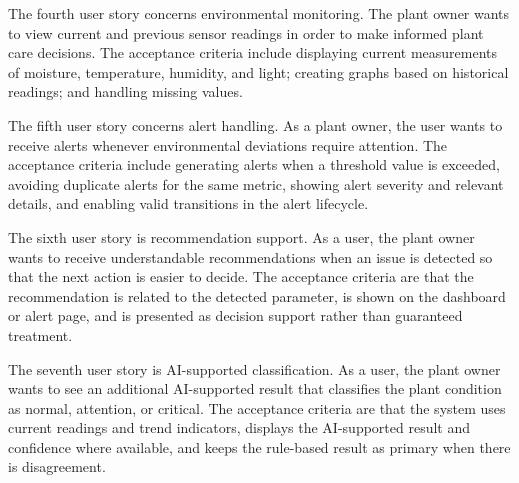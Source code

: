 The fourth user story concerns environmental monitoring. The plant owner wants to view current and previous sensor readings in order to make informed plant care decisions. The acceptance criteria include displaying current measurements of moisture, temperature, humidity, and light; creating graphs based on historical readings; and handling missing values.

The fifth user story concerns alert handling. As a plant owner, the user wants to receive alerts whenever environmental deviations require attention. The acceptance criteria include generating alerts when a threshold value is exceeded, avoiding duplicate alerts for the same metric, showing alert severity and relevant details, and enabling valid transitions in the alert lifecycle.

The sixth user story is recommendation support. As a user, the plant owner wants to receive understandable recommendations when an issue is detected so that the next action is easier to decide. The acceptance criteria are that the recommendation is related to the detected parameter, is shown on the dashboard or alert page, and is presented as decision support rather than guaranteed treatment.

The seventh user story is AI-supported classification. As a user, the plant owner wants to see an additional AI-supported result that classifies the plant condition as normal, attention, or critical. The acceptance criteria are that the system uses current readings and trend indicators, displays the AI-supported result and confidence where available, and keeps the rule-based result as primary when there is disagreement.

